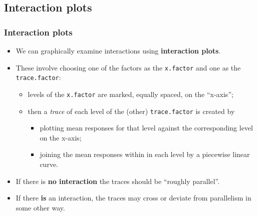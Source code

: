 \documentclass[a4paper]{article}
\begin{document}
\subsection{Interaction plots}
\subsubsection{Interaction plots}
\begin{itemize}
	\item We can graphically examine interactions using \textbf{interaction plots}.
	\item These involve choosing one of the factors as the \lstinline|x.factor| and one as the \lstinline|trace.factor|:
	\begin{itemize}
		\item levels of the \lstinline|x.factor| are marked, equally spaced, on the ``x-axis'';
		\item then a \textit{trace} of each level of the (other) \lstinline|trace.factor| is created by
		\begin{itemize}
			\item plotting mean responses for that level against the corresponding level on the x-axis;
			\item joining the mean responses within in each level by a piecewise linear curve.
		\end{itemize}
	\end{itemize}
	\item If there is \textbf{no interaction} the traces should be ``roughly parallel''.
	\item If there \textbf{is} an interaction, the traces may cross or deviate from parallelism in some other way.
\end{itemize}
\end{document}
